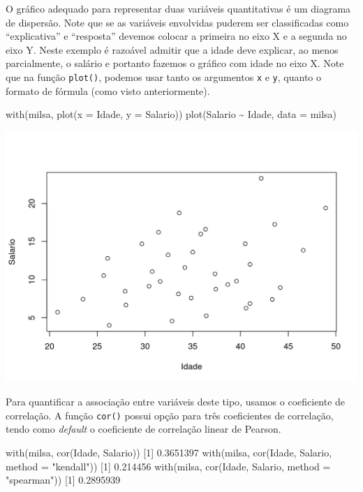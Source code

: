 \documentclass[
  10pt,
  a4paper]{book}
\newenvironment{Shaded}{\begin{snugshade}}{\end{snugshade}}
\newcommand{\AttributeTok}[1]{\textcolor[rgb]{0.77,0.63,0.00}{#1}}
\newcommand{\DecValTok}[1]{\textcolor[rgb]{0.00,0.00,0.81}{#1}}
\newcommand{\FloatTok}[1]{\textcolor[rgb]{0.00,0.00,0.81}{#1}}
\newcommand{\FunctionTok}[1]{\textcolor[rgb]{0.00,0.00,0.00}{#1}}
\newcommand{\NormalTok}[1]{#1}
\newcommand{\SpecialCharTok}[1]{\textcolor[rgb]{0.00,0.00,0.00}{#1}}
\newcommand{\StringTok}[1]{\textcolor[rgb]{0.31,0.60,0.02}{#1}}
\begin{document}
O gráfico adequado para representar duas variáveis quantitativas é
um diagrama de dispersão. Note que se as variáveis envolvidas puderem
ser classificadas como ``explicativa'' e ``resposta'' devemos colocar a
primeira no eixo X e a segunda no eixo Y. Neste exemplo é razoável
admitir que a idade deve explicar, ao menos parcialmente, o salário e
portanto fazemos o gráfico com idade no eixo X. Note que na função
\texttt{plot()}, podemos usar tanto os argumentos \texttt{x} e \texttt{y}, quanto o formato
de fórmula (como visto anteriormente).

\begin{Shaded}
\begin{Highlighting}[]
\FunctionTok{with}\NormalTok{(milsa, }\FunctionTok{plot}\NormalTok{(}\AttributeTok{x =}\NormalTok{ Idade, }\AttributeTok{y =}\NormalTok{ Salario))}
\FunctionTok{plot}\NormalTok{(Salario }\SpecialCharTok{\textasciitilde{}}\NormalTok{ Idade, }\AttributeTok{data =}\NormalTok{ milsa)}
\end{Highlighting}
\end{Shaded}

\begin{center}\includegraphics{figures/unnamed-chunk-325-1} \end{center}

Para quantificar a associação entre variáveis deste tipo, usamos o
coeficiente de correlação. A função \texttt{cor()} possui opção para três
coeficientes de correlação, tendo como \emph{default} o coeficiente de
correlação linear de Pearson.

\begin{Shaded}
\begin{Highlighting}[]
\FunctionTok{with}\NormalTok{(milsa, }\FunctionTok{cor}\NormalTok{(Idade, Salario))}
\NormalTok{[}\DecValTok{1}\NormalTok{] }\FloatTok{0.3651397}
\FunctionTok{with}\NormalTok{(milsa, }\FunctionTok{cor}\NormalTok{(Idade, Salario, }\AttributeTok{method =} \StringTok{"kendall"}\NormalTok{))}
\NormalTok{[}\DecValTok{1}\NormalTok{] }\FloatTok{0.214456}
\FunctionTok{with}\NormalTok{(milsa, }\FunctionTok{cor}\NormalTok{(Idade, Salario, }\AttributeTok{method =} \StringTok{"spearman"}\NormalTok{))}
\NormalTok{[}\DecValTok{1}\NormalTok{] }\FloatTok{0.2895939}
\end{Highlighting}
\end{Shaded}
\end{document}
